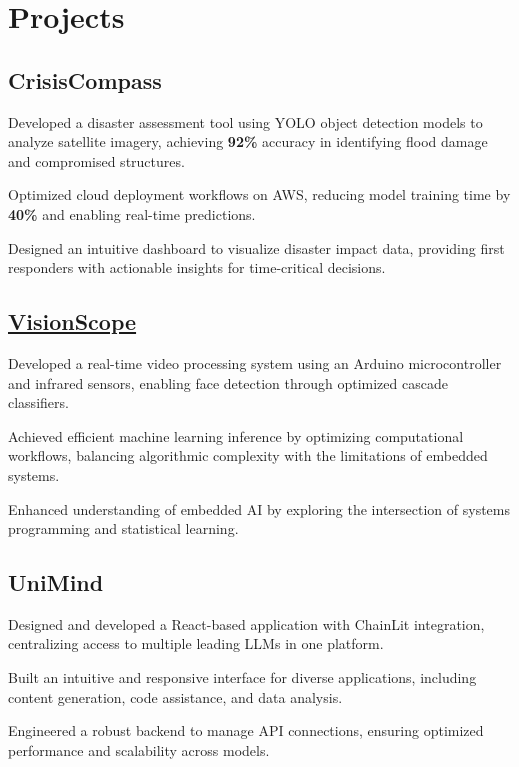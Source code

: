 \documentclass[]{farhan-resume-openfont}
\begin{document}
\begin{minipage}[t]{0.70\textwidth}
    \section{Projects}
    \subsection{{CrisisCompass}}
    \begin{tightemize}     \vspace{10pt}
        \item Developed a disaster assessment tool using YOLO object detection models to
        analyze satellite imagery, achieving \textbf{92\%} accuracy in identifying
        flood damage and compromised structures.
        \item Optimized cloud deployment workflows on AWS, reducing model training time by
        \textbf{40\%} and enabling real-time predictions.
        \item Designed an intuitive dashboard to visualize disaster impact data, providing
        first responders with actionable insights for time-critical decisions.
    \end{tightemize}
    \sectionsep

    \subsection{\href{https://arduino.cc/}{VisionScope}}
    \begin{tightemize}
        \vspace{10pt}
        \item Developed a real-time video processing system using an Arduino microcontroller
        and infrared sensors, enabling face detection through optimized cascade
        classifiers.
        \item Achieved efficient machine learning inference by optimizing computational
        workflows, balancing algorithmic complexity with the limitations of embedded
        systems.
        \item Enhanced understanding of embedded AI by exploring the intersection of systems
        programming and statistical learning.
    \end{tightemize}
    \sectionsep

    \subsection{{UniMind}}
    \begin{tightemize}
        \vspace{10pt}
        \item Designed and developed a React-based application with ChainLit integration,
        centralizing access to multiple leading LLMs in one platform.
        \item Built an intuitive and responsive interface for diverse applications, including
        content generation, code assistance, and data analysis.
        \item Engineered a robust backend to manage API connections, ensuring optimized
        performance and scalability across models.
    \end{tightemize}

\end{minipage}
\end{document}
